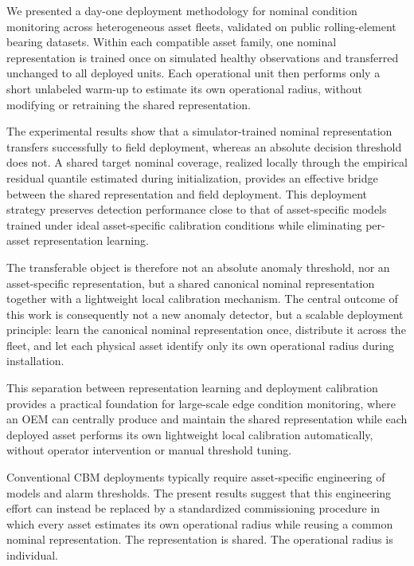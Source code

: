\documentclass[numbered]{trbunofficial}
\begin{document}
We presented a day-one deployment methodology for nominal condition monitoring across
heterogeneous asset fleets, validated on public rolling-element bearing datasets. Within each compatible asset family, one nominal representation is trained
once on simulated healthy observations and transferred unchanged to all
deployed units. Each operational unit then performs only a short unlabeled
warm-up to estimate its own operational radius, without modifying or retraining the shared
representation.

The experimental results show that a simulator-trained nominal representation transfers
successfully to field deployment, whereas an absolute decision threshold does not.
A shared target nominal coverage, realized locally through the empirical residual quantile estimated during initialization, 
provides an effective bridge between the shared representation and field deployment. This deployment strategy preserves detection performance
close to that of asset-specific models trained under ideal asset-specific calibration conditions
while eliminating per-asset representation learning.

The transferable object is therefore not an absolute anomaly threshold, nor an asset-specific
representation, but a shared canonical nominal representation together with a lightweight local
calibration mechanism. The central outcome of this work is consequently not a new anomaly
detector, but a scalable deployment principle: learn the canonical nominal representation once, 
distribute it across the fleet, and let each physical asset identify only its own operational
radius during installation.

This separation between representation learning and deployment calibration provides a practical
foundation for large-scale edge condition monitoring, where an OEM can centrally produce and
maintain the shared representation while each deployed asset performs its own lightweight local
calibration automatically, without operator intervention or manual threshold tuning.

Conventional CBM deployments typically require asset-specific engineering of models and alarm thresholds. The present results suggest that this engineering effort can instead be replaced by a standardized commissioning procedure in which every asset estimates its own operational radius while reusing a common nominal representation.
The representation is shared. The operational radius is individual.


% 


\end{document}
